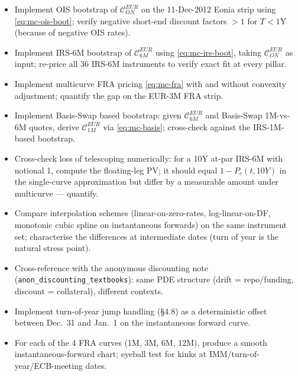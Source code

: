 \documentclass[11pt,a4paper]{article}
\begin{document}
\begin{todobox}
\begin{itemize}[noitemsep]
  \item Implement OIS bootstrap of $\mathcal{C}^{EUR}_{ON}$ on the
        11-Dec-2012 Eonia strip using \eqref{eq:mc-ois-boot};
        verify negative short-end discount factors $> 1$ for $T < 1$Y
        (because of negative OIS rates).
  \item Implement IRS-6M bootstrap of $\mathcal{C}^{EUR}_{6M}$ using
        \eqref{eq:mc-irs-boot}, taking $\mathcal{C}^{EUR}_{ON}$ as
        input; re-price all 36 IRS-6M instruments to verify exact
        fit at every pillar.
  \item Implement multicurve FRA pricing \eqref{eq:mc-fra} with and
        without convexity adjustment; quantify the gap on the
        EUR-3M FRA strip.
  \item Implement Basis-Swap based bootstrap: given $\mathcal{C}^{EUR}_{6M}$
        and Basis-Swap 1M-vs-6M quotes, derive $\mathcal{C}^{EUR}_{1M}$
        via \eqref{eq:mc-basis}; cross-check against the IRS-1M-based
        bootstrap.
  \item Cross-check loss of telescoping numerically: for a 10Y at-par
        IRS-6M with notional 1, compute the floating-leg PV; it should
        equal $1 - P_c(t, 10Y)$ in the single-curve approximation but
        differ by a measurable amount under multicurve --- quantify.
  \item Compare interpolation schemes (linear-on-zero-rates,
        log-linear-on-DF, monotonic cubic spline on instantaneous
        forwards) on the same instrument set; characterise the
        differences at intermediate dates (turn of year is the
        natural stress point).
  \item Cross-reference with the anonymous discounting note
        (\texttt{anon\_discounting\_textbooks}): same PDE structure
        (drift = repo/funding, discount = collateral), different
        contexts.
  \item Implement turn-of-year jump handling (\S4.8) as a
        deterministic offset between Dec.~31 and Jan.~1 on the
        instantaneous forward curve.
  \item For each of the 4 FRA curves (1M, 3M, 6M, 12M), produce a
        smooth instantaneous-forward chart; eyeball test for
        kinks at IMM/turn-of-year/ECB-meeting dates.
\end{itemize}
\end{todobox}
\end{document}
